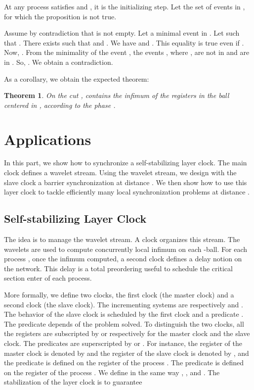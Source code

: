 \documentclass[11pt]{article}
\newenvironment{proof}{{\bf Proof. } }{{\hfill }\vspace{.5pc}}
\newtheorem{theorem}{Theorem}[section]
\begin{document}
\begin{proof}

At  any process  satisfies 
and , it is the initializing step. Let  the set
of events in , for
which the proposition is not true. 

Assume by contradiction that  is not
empty. Let  a minimal event in . Let  such that  .
There exists  such that  and . 
We have  and . This equality is
true even if .
Now, . From the minimality of the event , the events , where , 
are not in  and are in . 
So, . We obtain a contradiction. 
\end{proof}

As a corollary, we obtain the expected theorem:

\begin{theorem} On the cut , 
  contains the infimum of the registers  in the ball centered in , according to the phase .
\end{theorem}

\section{Applications}
\label{sec:distance_scheme}

In this part, we show how to synchronize a self-stabilizing layer clock. The main clock defines a wavelet stream. 
Using the wavelet stream, we design with the slave clock a barrier synchronization at distance . 
We then show how to use this layer clock to tackle efficiently many local synchronization problems at distance .

\subsection{Self-stabilizing Layer Clock}
\label{subsec:layer_clock}

The idea is to manage the wavelet stream. A clock organizes
this stream.  The wavelets are used to compute concurrently local infimum on
each  -ball. For each process , once the infimum computed, a second
clock defines a delay notion on the network. This delay is a total
preordering useful to schedule the critical section enter of each process. 





More formally, we define two clocks, the first clock  (the master clock) and a second clock  (the slave clock).  
The incrementing systems are respectively  
and    . The behavior of the slave clock  is scheduled by
the first clock and a predicate . The predicate  depends of the problem solved. 
To distinguish the two clocks, all the registers are subscripted by  or  respectively for the
master clock and the slave clock. The predicates are superscripted by  or .  For instance, the register of the master
clock is denoted by  and the register of the slave clock is denoted
by , and the predicate  is defined on the register 
 of the process .  The predicate  is defined on
the register  of the process .  We define in the same way , ,
and   .
The stabilization of the layer clock is to guarantee 
\end{document}
